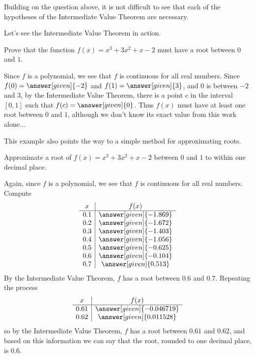 \documentclass{ximera}
\begin{document}
Building on the question above, it is not difficult to see that 
each of the hypotheses of the Intermediate Value Theorem are necessary.



Let's see the Intermediate Value Theorem in action.


\begin{example}
Prove that the function $f(x)=x^3 + 3x^2+x-2$ must have a root between $0$ and $1$.


\begin{explanation}
Since $f$ is a polynomial, we see that $f$ is continuous for all real
numbers.  Since $f(0)=\answer[given]{-2}$ and
$f(1)=\answer[given]{3}$, and $0$ is between $-2$ and $3$, by the
Intermediate Value Theorem, there is a point $c$ in the interval
$[0,1]$ such that $f(c)=\answer[given]{0}$. Thus $f(x)$ must have at least one root between $0$ and $1$, although we don't know its exact value from this work alone...
\end{explanation}
\end{example}



This example also points the way to a simple method for approximating
roots. 



\begin{example} 
Approximate a root of $f(x) =x^3 + 3x^2+x-2$ between $0$ and $1$ to
within one decimal place.

\begin{explanation} 
Again, since $f$ is a polynomial, we see that $f$ is continuous for
all real numbers. Compute
\[
\begin{array}{c|c}
  x   & f(x) \\ \hline
  0.1 & \answer[given]{-1.869}\\
  0.2 & \answer[given]{-1.672}\\
  0.3 & \answer[given]{-1.403}\\
  0.4 & \answer[given]{-1.056}\\
  0.5 & \answer[given]{-0.625}\\
  0.6 & \answer[given]{-0.104}\\
  0.7 & \answer[given]{0.513}
\end{array}
\]
By the Intermediate Value Theorem, $f$ has a root between $0.6$ and
$0.7$. Repeating the process
\[
\begin{array}{c|c}
  x   & f(x) \\ \hline
  0.61 & \answer[given]{-0.046719}\\
  0.62 & \answer[given]{0.011528}
\end{array}
\]
so by the Intermediate Value Theorem, $f$ has a root between $0.61$
and $0.62$, and based on this information we can say that the root, rounded to one decimal place, is $0.6$.
\end{explanation}
\end{example}
\end{document}

